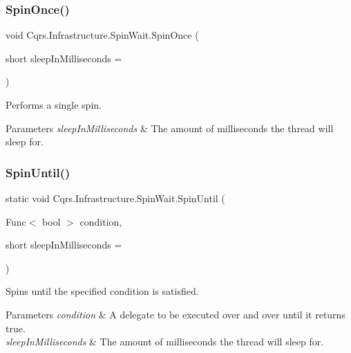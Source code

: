 \subsubsection{\texorpdfstring{Spin\+Once()}{SpinOnce()}}
{\footnotesize\ttfamily void Cqrs.\+Infrastructure.\+Spin\+Wait.\+Spin\+Once (\begin{DoxyParamCaption}\item[{short}]{sleep\+In\+Milliseconds = {} }\end{DoxyParamCaption})}



Performs a single spin. 


\begin{DoxyParams}{Parameters}
{\em sleep\+In\+Milliseconds} & The amount of milliseconds the thread will sleep for.\\
\hline
\end{DoxyParams}
\mbox{\label{structCqrs_1_1Infrastructure_1_1SpinWait_ae6b5bdef734568b515fa8d2ed04af9bb}} 
\subsubsection{\texorpdfstring{Spin\+Until()}{SpinUntil()}\hspace{0.1cm}{\footnotesize\ttfamily [1/3]}}
{\footnotesize\ttfamily static void Cqrs.\+Infrastructure.\+Spin\+Wait.\+Spin\+Until (\begin{DoxyParamCaption}\item[{Func$<$ bool $>$}]{condition,  }\item[{short}]{sleep\+In\+Milliseconds = {} }\end{DoxyParamCaption})\hspace{0.3cm}{\ttfamily [static]}}



Spins until the specified condition is satisfied. 


\begin{DoxyParams}{Parameters}
{\em condition} & A delegate to be executed over and over until it returns true.\\
\hline
{\em sleep\+In\+Milliseconds} & The amount of milliseconds the thread will sleep for.\\
\hline
\end{DoxyParams}

